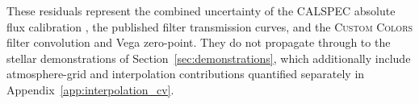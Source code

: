 These residuals represent the combined uncertainty of the CALSPEC absolute
flux calibration \citep[$\sim 1$--2 per cent at optical-to-near-infrared
wavelengths;][]{Bohlin2020}, the published filter transmission curves, and
the \textsc{Custom Colors} filter convolution and Vega zero-point.  They do
not propagate through to the stellar demonstrations of
Section~\ref{sec:demonstrations}, which additionally include atmosphere-grid
and interpolation contributions quantified separately in
Appendix~\ref{app:interpolation_cv}.
